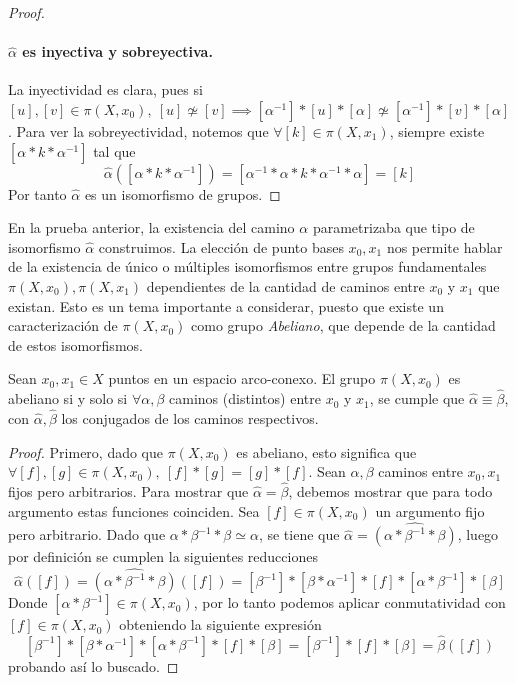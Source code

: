 {\begin{proof}
  \paragraph{\(\hat \alpha\) es inyectiva y sobreyectiva.} La inyectividad es
  clara, pues si \([u],[v] \in \pi (X, x_0),\ [u] \not \simeq [v]
  \implies [\alpha^{-1}] * [u] * [\alpha] \not \simeq [\alpha^{-1}] * [v]
  * [\alpha]\). Para ver la sobreyectividad, notemos que \(\forall [k] \in
  \pi (X, x_1) \), siempre existe \( [\alpha * k * \alpha^{-1}]\) tal
  que
  \[ \hat \alpha ([\alpha * k * \alpha^{-1}]) = [\alpha^{-1} * \alpha * k *
    \alpha^{-1} * \alpha] = [k]\]
  Por tanto \(\hat \alpha\) es un isomorfismo de grupos.
\end{proof}
En la prueba anterior, la existencia del camino \(\alpha\)
parametrizaba que tipo de isomorfismo \(\hat \alpha\) construimos.
La elección de punto bases
\(x_0, x_1\) nos permite hablar de la existencia de único o múltiples
isomorfismos entre grupos fundamentales \(\pi (X, x_0), \pi (X, x_1) \)
dependientes de la cantidad de caminos entre \(x_0\) y \(x_1\) que
existan. Esto es un tema importante a considerar, puesto que existe un
caracterización de \(\pi (X, x_0) \) como grupo \emph{Abeliano}, que depende de
la cantidad de estos isomorfismos.
\begin{teorema}
  Sean \(x_0, x_1 \in X\) puntos en un espacio arco-conexo. El grupo
  \(\pi (X, x_0) \) es abeliano si y solo si \(\forall \alpha, \beta\)
  caminos (distintos) entre \(x_0\) y \(x_1\), se cumple que \(\hat \alpha \equiv
  \hat \beta\), con \(\hat \alpha, \hat \beta\) los conjugados de los
  caminos respectivos.
\end{teorema}
\begin{proof}
  Primero, dado que \(\pi (X, x_0)\) es
  abeliano, esto significa que \(\forall [f],[g] \in \pi (X, x_0),\ [f]
  * [g] = [g] * [f]\). Sean \(\alpha, \beta\) caminos entre \(x_0,x_1\)
  fijos pero arbitrarios. Para mostrar que \( \hat \alpha = \hat \beta\),
  debemos mostrar que para todo argumento estas funciones coinciden. Sea
  \([f] \in \pi (X, x_0) \) un argumento fijo pero arbitrario. Dado que
  \(\alpha * \beta^{-1} * \beta \simeq \alpha \), se tiene que
  \( \hat \alpha = \widehat{(\alpha * \beta^{-1} * \beta)}\), luego por definición
  se cumplen la siguientes reducciones
  \[ \hat \alpha ([f]) = \widehat{(\alpha * \beta^{-1} * \beta)} ([f]) =
    [\beta^{-1}] * [\beta * \alpha^{-1}] * [f] * [\alpha * \beta^{-1}]
    * [\beta] \]
  Donde \([\alpha * \beta^{-1}] \in \pi (X, x_0) \), por lo tanto podemos
  aplicar conmutatividad con \([f] \in \pi (X,x_0)\) obteniendo la
  siguiente expresión
  \[ [\beta^{-1}] * [\beta * \alpha^{-1}] * [\alpha * \beta^{-1}] * [f]
    * [\beta] = [\beta^{-1}] * [f] * [\beta] = \hat \beta ([f]) \]
  probando así lo buscado.


\end{proof}}
